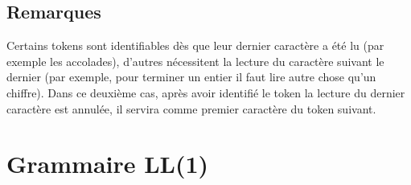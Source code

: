 \documentclass[a4paper,10pt]{article}
\begin{document}
	\subsection{Remarques}
		Certains tokens sont identifiables dès que leur dernier caractère a été lu (par exemple les accolades), 
		d'autres nécessitent la lecture du caractère suivant le dernier (par exemple, pour terminer un entier il faut lire autre chose qu'un chiffre).
		Dans ce deuxième cas, après avoir identifié le token la lecture du dernier caractère est annulée, il servira comme premier caractère du token suivant.

\section{Grammaire LL(1)}

\newcommand{\varname}[1]{\begin{math}\langle\end{math}#1\begin{math}\rangle\end{math}}
\newcommand{\num}[1]{\begin{math}[#1]\end{math}}
\end{document}
